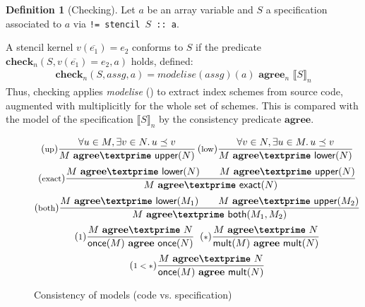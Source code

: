 \documentclass[10pt,preprint]{sigplanconf}
\newcounter{block}
\theoremstyle{definition}
\newtheorem{definition}[block]{Definition}
\newcommand{\interp}[1]{\llbracket{#1}\rrbracket}
\newcommand{\trule}[1]{{\footnotesize{(\text{#1})}}}
\newcommand{\consName}{\textbf{agree\textprime}}
\newcommand{\cons}[2]{#1 \,\, \consName{} \,\, #2}
\newcommand{\consAName}{\textbf{agree}}
\newcommand{\consA}[2]{#1 \,\, \consAName{} \,\, #2}
\newcommand{\consSub}[3]{#2 \,\, \consAName{}_{#1} \,\,#3}
\begin{document}
\begin{definition}[Checking]
Let $a$ be an array variable and
$S$ a specification associated to $a$
via \texttt{!= stencil $S$ :: a}.

A stencil kernel
 $v(\overline{e_1}) = e_2$
conforms to $S$ if the predicate $\textbf{check}_n(S, v(\overline{e_1}) = e_2, a)$ holds,
defined:
\begin{align*}
& \textbf{check}_n(S, \textit{assg}, a) =
  \consSub{n}{\textit{modelise}(\textit{assg})(a)}{\interp{S}_n}
&
\end{align*}
Thus, checking applies \textit{modelise}
() to extract index schemes from source code,
augmented with multiplicitly for the whole set of schemes.
This is compared with the model of the specification $\interp{S}_n$ by
the consistency predicate $\consAName$.
\end{definition}


\begin{figure}[t]
\vspace{-1em}
\begin{align*}
\hspace{-0.5em}
\begin{array}{c}
\trule{up}\dfrac{\forall u \in M, \exists v \in N .  \, u \preceq v}
      {\cons{M}{\textsf{upper}(N)}}
\,
\trule{low}\dfrac{\forall v \in N, \exists u \in M . \, u \preceq v}
      {\cons{M}{\textsf{lower}(N)}} \\[1.2em]
\trule{exact}\dfrac{\cons{M}{\textsf{lower}(N)} \qquad \cons{M}{\textsf{upper}(N)}}
  {\cons{M}{\textsf{exact}(N)}} \\[1.2em]
\trule{both}\dfrac{\cons{M}{\textsf{lower}(M_1)} \qquad \cons{M}{\textsf{upper}(M_2)}}
  {\cons{M}{\textsf{both}(M_1, M_2)}}\\[1.2em]
\trule{$1$}
\dfrac{\cons{M}{N}}{\consA{\textsf{once}(M)}{\textsf{once}(N)}}
\;\;
\trule{$*$}
\dfrac{\cons{M}{N}}{\consA{\textsf{mult}(M)}{\textsf{mult}(N)}}
  \\[1.2em]
\trule{$1 < *$}
\dfrac{\cons{M}{N}}{\consA{\textsf{once}(M)}{\textsf{mult}(N)}}
\end{array}
\end{align*}
\vspace{-0.5em}
\caption{Consistency of models (code vs. specification)}
\label{fig:consistency}
\vspace{-0.9em}
\end{figure}
\end{document}
